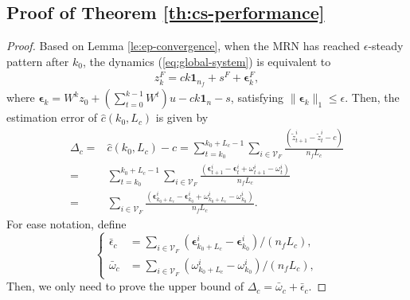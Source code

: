\documentclass[12pt,journal,draftclsnofoot,onecolumn]{IEEEtran}
\let \sss=\scriptscriptstyle
\begin{document}
\subsection{Proof of Theorem \ref{th:cs-performance}}\label{apdix:cs-performance}
\begin{proof}
Based on Lemma \ref{le:ep-convergence}, when the MRN has reached $\epsilon$-steady pattern after $k_0$, the dynamics (\ref{eq:global-system}) is equivalent to 
\begin{align}\label{eq:equivalent-state}
z_{k}^{\sss F}=ck\bm{1}_{n_f}+s^{\sss F}+\bm{\epsilon}_k^{\sss F},
\end{align}
where $\bm{\epsilon}_k=W^{k}z_{0}+\left(\sum\nolimits_{t=0}^{k-1} W^{t}\right)u - ck\bm{1}_n-s $, satisfying $\| \bm{\epsilon}_k \|_1 \le \epsilon $. 
Then, the estimation error of $\hat c(k_0,L_c)$ is given by 
\begin{align}\label{eq:c-error0}
\Delta_c=&\hat c(k_0,L_c)-c = \sum\limits_{t= k_0}^{k_0+L_c-1}  \sum\limits_{i\in\mathcal{V}_{\sss F}}  \frac{(\tilde{z}_{t+1}^{i}-\tilde{z}_{t}^{i}-c) } { {n_f}{L_c} } \nonumber  \\
=& \sum\limits_{t= k_0}^{k_0+L_c-1}  \sum\limits_{i\in\mathcal{V}_{\sss F}} \frac{( \bm{\epsilon}_{t+1}^i - \bm{\epsilon}_{t}^i + \omega_{t+1}^i - \omega_{t}^i  ) } { {n_f}{L_c} } \nonumber \\
=& \sum\limits_{i\in\mathcal{V}_{\sss F}} \frac{( \bm{\epsilon}_{k_0+L_c}^i - \bm{\epsilon}_{k_0}^i + \omega_{k_0+L_c}^i - \omega_{k_0}^i  ) }{ {n_f}{L_c} } . 
\end{align}
For ease notation, define
\begin{equation}\label{eq:epsilon-omega-c}
\left \{
\begin{aligned}
\bar{\epsilon}_c&=\sum\limits_{i\in\mathcal{V}_{\sss F}} ( \bm{\epsilon}_{k_0+L_c}^i - \bm{\epsilon}_{k_0}^i  )/{ ({n_f}{L_c}) }, \\
\bar{\omega}_c&=\sum\limits_{i\in\mathcal{V}_{\sss F}} (\omega_{k_0+L_c}^i - \omega_{k_0}^i  )/{ ({n_f}{L_c}) },  
\end{aligned} \right.
\end{equation}
Then, we only need to prove the upper bound of $\Delta_c = \bar{\omega}_c + \bar{\epsilon}_c . $


\end{proof}
\end{document}

